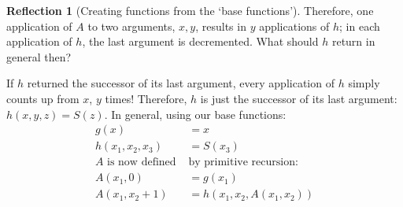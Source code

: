 \documentclass[11pt]{book}
\theoremstyle{definition}
\theoremstyle{plain}
\theoremstyle{problemstyle}
\theoremstyle{remark}
\theoremstyle{definition}
\newtheorem{reflection}{Reflection}
\begin{document}
\begin{reflection}[Creating functions from the `base functions']
            Therefore, one application of $A$ to two arguments, $x, y$, results in $y$ applications of $h$; in each application of $h$, the last argument is decremented. What should $h$ return in general then?

            If $h$ returned the successor of its last argument, every application of $h$ simply counts up from $x$, $y$ times!
            Therefore, $h$ is just the successor of its last argument: $h(x,y,z)=S(z)$. In general, using our base functions:
            \begin{equation}
                \label{eq:addition-by-primitive-recursion}
                \begin{aligned}
                    g(x)&=x\\
                    h(x_1,x_2,x_3)&=S(x_3)\\
                    \text{$A$ is now defined }&\text{by primitive recursion:}\\
                    A(x_1,0)&=g(x_1)\\
                    A(x_1,x_2+1)&=h(x_1,x_2,A(x_1,x_2))
                \end{aligned}
            \end{equation}
\end{reflection}
\end{document}
